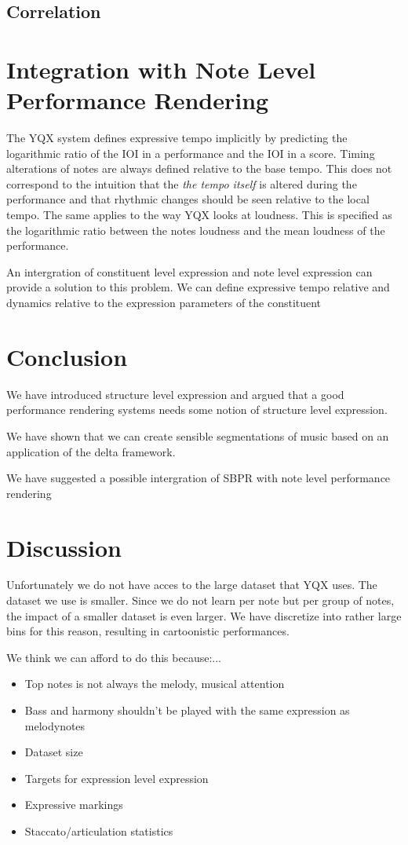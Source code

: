 \documentclass[a4paper,10pt]{article}
\begin{document}
\subsection{Correlation}
\section{Integration with Note Level Performance Rendering}

The YQX system defines expressive tempo implicitly by predicting the logarithmic ratio of the IOI in a performance and the IOI in a score. Timing alterations of notes are always defined relative to the base tempo. This does not correspond to the intuition that the \textit{the tempo itself} is altered during the performance and that rhythmic changes should be seen relative to the local tempo. The same applies to the way YQX looks at loudness. This is specified as the logarithmic ratio between the notes loudness and the mean loudness of the performance. 

An intergration of constituent level expression and note level expression can provide a solution to this problem. We can define expressive tempo relative and dynamics relative to the expression parameters of the constituent

\section{Conclusion}
We have introduced structure level expression and argued that a good performance rendering systems needs some notion of structure level expression. 

We have shown that we can create sensible segmentations of music based on an application of the delta framework. \cite{markwin} 

We have suggested a possible intergration of SBPR with note level performance rendering
\section{Discussion}

Unfortunately we do not have acces to the large dataset that YQX uses. The dataset we use is smaller. Since we do not learn per note but per group of notes, the impact of a smaller dataset is even larger. We have discretize into rather large bins for this reason, resulting in cartoonistic performances. 

We think we can afford to do this because:...

\begin{itemize}
\item Top notes is not always the melody, musical attention
\item Bass and harmony shouldn't be played with the same expression as melodynotes
\item Dataset size
\item Targets for expression level expression
\item Expressive markings
\item Staccato/articulation statistics
\end{itemize}
\end{document}
